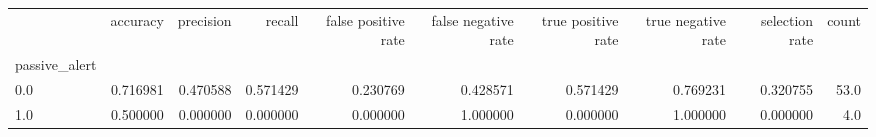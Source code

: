 \begin{tabular}{lrrrrrrrrr}
\toprule
{} &  accuracy &  precision &    recall &  false positive rate &  false negative rate &  true positive rate &  true negative rate &  selection rate &  count \\
passive\_alert &           &            &           &                      &                      &                     &                     &                 &        \\
\midrule
0.0           &  0.716981 &   0.470588 &  0.571429 &             0.230769 &             0.428571 &            0.571429 &            0.769231 &        0.320755 &   53.0 \\
1.0           &  0.500000 &   0.000000 &  0.000000 &             0.000000 &             1.000000 &            0.000000 &            1.000000 &        0.000000 &    4.0 \\
\bottomrule
\end{tabular}

